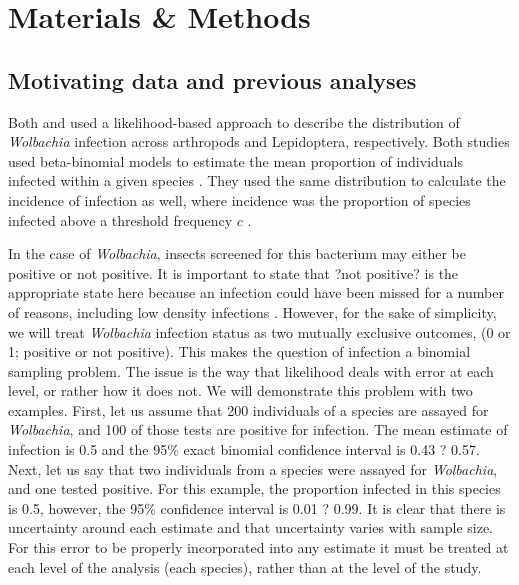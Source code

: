 \documentclass{frontiersSCNS}
\begin{document}
\section{Materials \& Methods}
\subsection{Motivating data and previous analyses}

 Both \cite{Weinert:2015aa} and \cite{Ahmed:2015aa} used a likelihood-based approach to describe the distribution of \emph{Wolbachia} infection across arthropods and Lepidoptera, respectively. Both studies used beta-binomial models to estimate the mean proportion of individuals infected within a given species \citep{Hilgenboecker:2008aa}. They used the same distribution to calculate the incidence of infection as well, where incidence was the proportion of species infected above a threshold frequency $c$  \citep[i.e.,, one infection in 1000 individuals, or 0.001;][]{Weinert:2015aa}. 

In the case of \textit{Wolbachia}, insects screened for this bacterium may either be positive or not positive. It is important to state that ?not positive? is the appropriate state here because an infection could have been missed for a number of reasons, including low density infections \citep{Schneider:2014jv}. However, for the sake of simplicity, we will treat \textit{Wolbachia} infection status as two mutually exclusive outcomes, (0 or 1; positive or not positive). This makes the question of infection a binomial sampling problem. The issue is the way that likelihood deals with error at each level, or rather how it does not. We will demonstrate this problem with two examples. First, let us assume that 200 individuals of a species are assayed for \textit{Wolbachia}, and 100 of those tests are positive for infection. The mean estimate of infection is 0.5 and the 95\% exact binomial confidence interval is 0.43 ? 0.57. Next, let us say that two individuals from a species were assayed for \textit{Wolbachia}, and one tested positive. For this example, the proportion infected in this species is 0.5, however, the 95\% confidence interval is 0.01 ? 0.99. It is clear that there is uncertainty around each estimate and that uncertainty varies with sample size. For this error to be properly incorporated into any estimate it must be treated at each level of the analysis (each species), rather than at the level of the study. 
\end{document}

